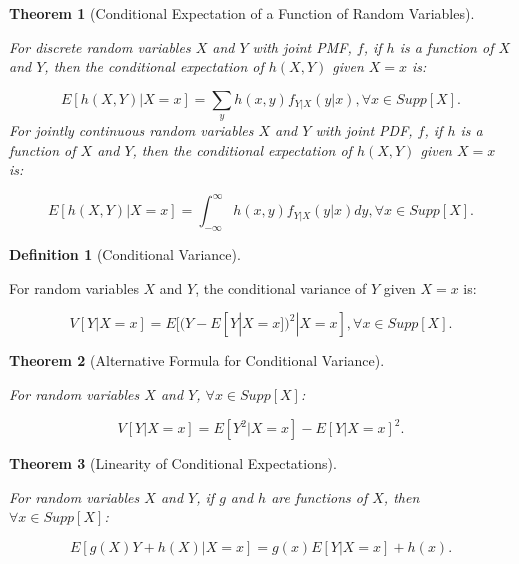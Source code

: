 \documentclass[
]{article}
\newtheorem{theorem}{Theorem}[section]
\theoremstyle{definition}
\newtheorem{definition}{Definition}[section]
\theoremstyle{definition}
\theoremstyle{definition}
\theoremstyle{remark}
\begin{document}
\begin{theorem}[Conditional Expectation of a Function of Random Variables]
\protect\hypertarget{thm:unlabeled-div-89}{}\label{thm:unlabeled-div-89}

For discrete random variables \(X\) and \(Y\) with joint PMF, \(f\), if \(h\) is a function of \(X\) and \(Y\), then the conditional expectation of \(h(X,Y)\) given \(X=x\) is:

\[E[h(X,Y) | X=x] = \sum_yh(x,y)f_{Y|X}(y|x), \forall x \in Supp[X].\]
For jointly continuous random variables \(X\) and \(Y\) with joint PDF, \(f\), if \(h\) is a function of \(X\) and \(Y\), then the conditional expectation of \(h(X,Y)\) given \(X=x\) is:

\[E[h(X,Y) | X=x] = \int_{-\infty}^{\infty}h(x,y)f_{Y|X}(y|x)dy, \forall x \in Supp[X].\]

\end{theorem}

\begin{definition}[Conditional Variance]
\protect\hypertarget{def:unlabeled-div-90}{}\label{def:unlabeled-div-90}

For random variables \(X\) and \(Y\), the conditional variance of \(Y\) given \(X=x\) is:

\[V[Y | X=x] = E[(Y - E[Y | X=x])^2 | X=x], \forall x \in Supp[X].\]

\end{definition}

\begin{theorem}[Alternative Formula for Conditional Variance]
\protect\hypertarget{thm:unlabeled-div-91}{}\label{thm:unlabeled-div-91}

For random variables \(X\) and \(Y\), \(\forall x \in Supp[X]\):

\[V[Y | X=x] = E[Y^2 | X=x] - E[Y | X=x]^2.\]

\end{theorem}

\begin{theorem}[Linearity of Conditional Expectations]
\protect\hypertarget{thm:unlabeled-div-92}{}\label{thm:unlabeled-div-92}

For random variables \(X\) and \(Y\), if \(g\) and \(h\) are functions of \(X\), then \(\forall x \in Supp[X]\):

\[E[g(X)Y+h(X) | X=x] = g(x)E[Y | X=x] + h(x).\]

\end{theorem}
\end{document}
